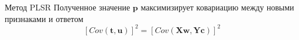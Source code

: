 \documentclass{beamer}
\newcommand{\bw}{\mathbf{w}}
\newcommand{\bY}{\mathbf{Y}}
\newcommand{\bX}{\mathbf{X}}
\newcommand{\bu}{\mathbf{u}}
\newcommand{\bt}{\mathbf{t}}
\newcommand{\bp}{\mathbf{p}}
\newcommand{\bq}{\mathbf{q}}
\newcommand{\bv}{\mathbf{v}}
\newcommand{\bc}{\mathbf{c}}
\newcommand{\bs}{\mathbf{s}}
\newcommand{\bP}{\mathbf{P}}
\newcommand{\bT}{\mathbf{T}}
\newcommand{\bQ}{\mathbf{Q}}
\newcommand{\bE}{\mathbf{E}}
\newcommand{\bU}{\mathbf{U}}
\newcommand{\bD}{\mathbf{D}}
\newcommand{\bZ}{\mathbf{Z}}
\newcommand{\bM}{\mathbf{M}}
\newcommand{\T}{^{\text{\tiny\sffamily\upshape\mdseries T}}}
\begin{document}
\begin{frame}{Метод PLSR}
Полученное значение $\bp$ максимизирует ковариацию между новыми признаками и ответом
  \[
    [Cov( \bt, \bu)]^2 = [Cov(\bX \bw, \bY \bc)]^2 
  \]

\end{frame}





\end{document}

